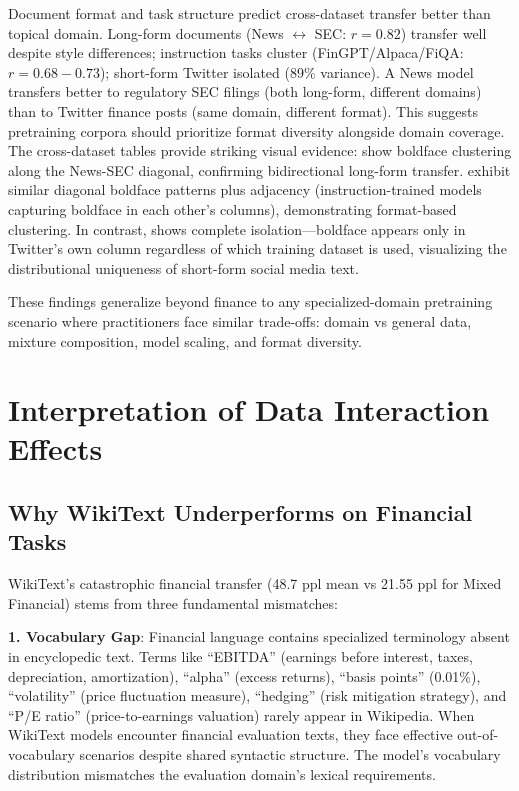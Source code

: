 Document format and task structure predict cross-dataset transfer better than topical domain. Long-form documents (News $\leftrightarrow$ SEC: $r = 0.82$) transfer well despite style differences; instruction tasks cluster (FinGPT/Alpaca/FiQA: $r = 0.68-0.73$); short-form Twitter isolated (89\% variance). A News model transfers better to regulatory SEC filings (both long-form, different domains) than to Twitter finance posts (same domain, different format). This suggests pretraining corpora should prioritize format diversity alongside domain coverage. The cross-dataset tables provide striking visual evidence:  show boldface clustering along the News-SEC diagonal, confirming bidirectional long-form transfer.  exhibit similar diagonal boldface patterns plus adjacency (instruction-trained models capturing boldface in each other's columns), demonstrating format-based clustering. In contrast,  shows complete isolation—boldface appears only in Twitter's own column regardless of which training dataset is used, visualizing the distributional uniqueness of short-form social media text.

These findings generalize beyond finance to any specialized-domain pretraining scenario where practitioners face similar trade-offs: domain vs general data, mixture composition, model scaling, and format diversity.

\section{Interpretation of Data Interaction Effects}

\subsection{Why WikiText Underperforms on Financial Tasks}

WikiText's catastrophic financial transfer (48.7 ppl mean vs 21.55 ppl for Mixed Financial) stems from three fundamental mismatches:

\textbf{1. Vocabulary Gap}: Financial language contains specialized terminology absent in encyclopedic text. Terms like ``EBITDA'' (earnings before interest, taxes, depreciation, amortization), ``alpha'' (excess returns), ``basis points'' (0.01\%), ``volatility'' (price fluctuation measure), ``hedging'' (risk mitigation strategy), and ``P/E ratio'' (price-to-earnings valuation) rarely appear in Wikipedia. When WikiText models encounter financial evaluation texts, they face effective out-of-vocabulary scenarios despite shared syntactic structure. The model's vocabulary distribution mismatches the evaluation domain's lexical requirements.

